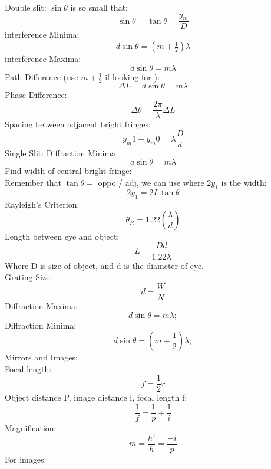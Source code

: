 \documentclass[11pt]{article}
\begin{document}
    Double slit:
    \vspace{2em}
    $\sin \theta$ is so small that:
    \begin{equation}
      \sin \theta = \tan \theta = \frac{y_m}{D}
    \end{equation}
    interference Minima:
    \begin{equation}
      d \sin \theta = (m+\tfrac{1}{2}) \lambda
      \end{equation}
interference Maxima: 
\begin{equation}
  d \sin \theta = m\lambda
  \end{equation}
  Path Difference (use $m + \tfrac{1}{2}$ if looking for ):
  \begin{equation}
    \Delta L = d \sin \theta = m \lambda
  \end{equation}
Phase Difference:
\begin{equation}
  \Delta \theta = \frac{2 \pi}{\lambda}\Delta L
\end{equation}
Spacing between adjacent bright fringes:
\begin{equation}
  y_m1 - y_m0 = \lambda \frac{D}{d}
\end{equation}
\newpage
Single Slit:
Diffraction Minima 
\begin{equation}
  a \sin \theta = m \lambda
\end{equation}
Find width of central bright fringe:\\
Remember that $\tan \theta = $ oppo / adj,
we can use where $2 y_1$ is the width:
\begin{equation}
 2 y_1 = 2 L \tan \theta
\end{equation}
Rayleigh's Criterion:
\begin{equation}
  \theta_R = 1.22 (\frac{\lambda}{d})
\end{equation}
Length between eye and object:
\begin{equation}
  L = \frac{Dd}{1.22 \lambda}
\end{equation}
Where D is size of object, and d is the diameter of eye.\\
Grating Size:
\begin{equation}
  d = \frac{W}{N}
\end{equation}
Diffraction Maxima:
\begin{equation}
  d \sin \theta = m \lambda;
\end{equation}
Diffraction Minima: 
\begin{equation}
d \sin \theta = (m + \frac{1}{2}) \lambda;
\end{equation}
Mirrors and Images:\\
Focal length:
\begin{equation}
  f = \frac{1}{2} r
\end{equation}
Object distance P, image distance i, focal length f:
\begin{equation}
  \frac{1}{f} = \frac{1}{p} + \frac{1}{i}
\end{equation}
Magnification:
\begin{equation}
  m = \frac{h'}{h} = \frac{-i}{p}
\end{equation}
For images: 
\end{document}
